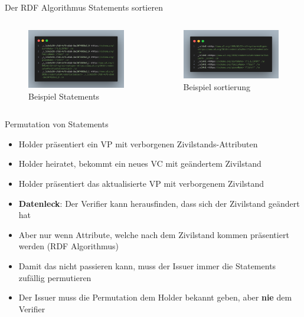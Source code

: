 \documentclass[
	german,%
	authorontitle=true,
	]{bfhbeamer}
\begin{document}
\begin{frame}{Der RDF Algorithmus}
    \centering
    Statements sortieren
    \begin{columns}[onlytextwidth,T]
        \column{70mm}  
        \begin{figure}
            \centering
            \includegraphics[width=70mm]{../img/Statements.png}
            \caption{Beispiel Statements}
        \end{figure}

        \column{70mm}  
        \begin{figure}
            \centering
            \includegraphics[width=70mm]{../img/hashed.png}
            \caption{Beispiel sortierung}
        \end{figure}
    \end{columns}
\end{frame}

\begin{frame}{Permutation von Statements}
    \begin{itemize}
        \item Holder präsentiert ein VP mit verborgenen Zivilstands-Attributen
        \item Holder heiratet, bekommt ein neues VC mit geändertem Zivilstand
        \item Holder präsentiert das aktualisierte VP mit verborgenem Zivilstand
        \item \textbf{Datenleck}: Der Verifier kann herausfinden, dass sich der Zivilstand geändert hat
        \item Aber nur wenn Attribute, welche nach dem Zivilstand kommen präsentiert werden (RDF Algorithmus)
        \item Damit das nicht passieren kann, muss der Issuer immer die Statements zufällig permutieren
        \item Der Issuer muss die Permutation dem Holder bekannt geben, aber \textbf{nie} dem Verifier
    \end{itemize}
\end{frame}
\end{document}
